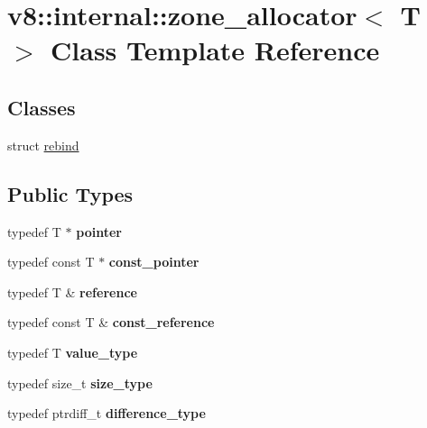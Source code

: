 \hypertarget{classv8_1_1internal_1_1zone__allocator}{}\section{v8\+:\+:internal\+:\+:zone\+\_\+allocator$<$ T $>$ Class Template Reference}
\label{classv8_1_1internal_1_1zone__allocator}
\subsection*{Classes}
\begin{DoxyCompactItemize}
\item 
struct \hyperlink{structv8_1_1internal_1_1zone__allocator_1_1rebind}{rebind}
\end{DoxyCompactItemize}
\subsection*{Public Types}
\begin{DoxyCompactItemize}
\item 
\hypertarget{classv8_1_1internal_1_1zone__allocator_ac88f72e9cd57a798719633ae06c962ca}{}typedef T $\ast$ {\bfseries pointer}\label{classv8_1_1internal_1_1zone__allocator_ac88f72e9cd57a798719633ae06c962ca}

\item 
\hypertarget{classv8_1_1internal_1_1zone__allocator_aabd57c53ad39267436b4cfd3dc9f8488}{}typedef const T $\ast$ {\bfseries const\+\_\+pointer}\label{classv8_1_1internal_1_1zone__allocator_aabd57c53ad39267436b4cfd3dc9f8488}

\item 
\hypertarget{classv8_1_1internal_1_1zone__allocator_a73ad2c4458a6b4d97114e8bcdecb4a90}{}typedef T \& {\bfseries reference}\label{classv8_1_1internal_1_1zone__allocator_a73ad2c4458a6b4d97114e8bcdecb4a90}

\item 
\hypertarget{classv8_1_1internal_1_1zone__allocator_a3c843bf2eafdcb6db1c195c9a1cb7a01}{}typedef const T \& {\bfseries const\+\_\+reference}\label{classv8_1_1internal_1_1zone__allocator_a3c843bf2eafdcb6db1c195c9a1cb7a01}

\item 
\hypertarget{classv8_1_1internal_1_1zone__allocator_a69f4aa8da7b64ff03d63d7b86af3de6b}{}typedef T {\bfseries value\+\_\+type}\label{classv8_1_1internal_1_1zone__allocator_a69f4aa8da7b64ff03d63d7b86af3de6b}

\item 
\hypertarget{classv8_1_1internal_1_1zone__allocator_a5d7dae728ae0be78a49211b55a634e12}{}typedef size\+\_\+t {\bfseries size\+\_\+type}\label{classv8_1_1internal_1_1zone__allocator_a5d7dae728ae0be78a49211b55a634e12}

\item 
\hypertarget{classv8_1_1internal_1_1zone__allocator_a0fe1871e429a54a9bd9bec86f1964cb2}{}typedef ptrdiff\+\_\+t {\bfseries difference\+\_\+type}\label{classv8_1_1internal_1_1zone__allocator_a0fe1871e429a54a9bd9bec86f1964cb2}

\end{DoxyCompactItemize}
